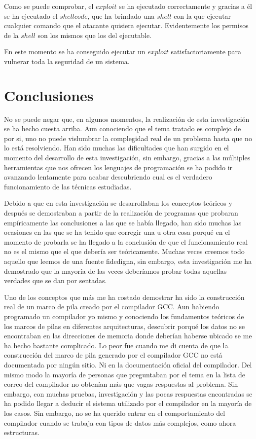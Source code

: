 \documentclass [titlepage, 12pt]{article}
\begin{document}
Como se puede comprobar, el $exploit$ se ha ejecutado correctamente y gracias a \'el se ha ejecutado el $shellcode$, que ha brindado una $shell$ con la que ejecutar cualquier comando que el atacante quisiera ejecutar. Evidentemente los permisos de la $shell$ son los mismos que los del ejecutable. \bigskip

En este momento se ha conseguido ejecutar un $exploit$ satisfactoriamente para vulnerar toda la seguridad de un sistema.

\pagebreak

\section{Conclusiones}
\bigskip
No se puede negar que, en algunos momentos, la realizaci\'on de esta investigaci\'on se ha hecho cuesta arriba. Aun conociendo que el tema tratado es complejo de por si, uno no puede vislumbrar la complegidad real de un problema hasta que no lo est\'a resolviendo. Han sido muchas las dificultades que han surgido en el momento del desarrollo de esta investigaci\'on, sin embargo, gracias a las m\'ultiples herramientas que nos ofrecen los lenguajes de programaci\'on se ha podido ir avanzando lentamente para acabar descubriendo cual es el verdadero funcionamiento de las t\'ecnicas estudiadas.\bigskip

Debido a que en esta investigaci\'on se desarrollaban los conceptos te\'oricos y despu\'es se demostraban a partir de la realizaci\'on de programas que probaran emp\'iricamente las conclusiones a las que se hab\'ia llegado, han sido muchas las ocasiones en las que se ha tenido que corregir una u otra cosa porqu\'e en el momento de probarla se ha llegado a la conclusi\'on de que el funcionamiento real no es el mismo que el que deber\'ia ser te\'oricamente. Muchas veces creemos todo aquello que leemos de una fuente fidedigna, sin embargo, esta investigaci\'on me ha demostrado que la mayor\'ia de las veces deber\'iamos probar todas aquellas verdades que se dan por sentadas.\bigskip

Uno de los conceptos que m\'as me ha costado demostrar ha sido la construcci\'on real de un marco de pila creado por el compilador GCC. Aun habiendo programado un compilador yo mismo y conociendo los fundamentos te\'oricos de los marcos de pilas en diferentes arquitecturas, descubrir porqu\'e los datos no se encontraban en las direcciones de memoria donde deber\'ian haberse ubicado se me ha hecho bastante complicado. Lo peor fue cuando me di cuenta de que la construcci\'on del marco de pila generado por el compilador GCC no est\'a documentada por ning\'un sitio. Ni en la documentaci\'on oficial del compilador. Del mismo modo la mayor\'ia de personas que preguntaban por el tema en la lista de correo del compilador no obten\'ian m\'as que vagas respuestas al problema. Sin embargo, con muchas pruebas, investigaci\'on y las pocas respuestas encontradas se ha podido llegar a deducir el sistema utilizado por el compilador en la mayor\'ia de los casos. Sin embargo, no se ha querido entrar en el comportamiento del compilador cuando se trabaja con tipos de datos
m\'as complejos, como ahora estructuras. \bigskip
\end{document}
